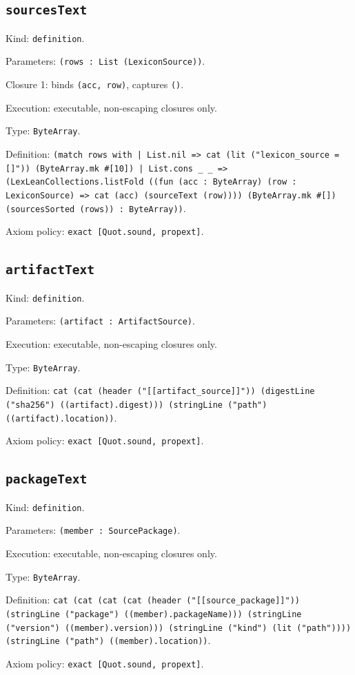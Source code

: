 \documentclass[11pt]{article}
\begin{document}
\subsection*{\texttt{sourcesText}}
\noindent Kind: \texttt{definition}.\par
\noindent Parameters: \texttt{(rows : List (LexiconSource))}.\par
\noindent Closure 1: binds \texttt{(acc, row)}, captures \texttt{()}.\par
\noindent Execution: executable, non-escaping closures only.\par
\noindent Type: \texttt{ByteArray}.\par
\noindent Definition: \texttt{(match rows with | List.nil => cat (lit ("lexicon\_source = []")) (ByteArray.mk \#[10]) | List.cons \_ \_ => (LexLeanCollections.listFold ((fun (acc : ByteArray) (row : LexiconSource) => cat (acc) (sourceText (row)))) (ByteArray.mk \#[]) (sourcesSorted (rows)) : ByteArray))}.\par
\noindent Axiom policy: \texttt{exact [Quot.sound, propext]}.\par
\subsection*{\texttt{artifactText}}
\noindent Kind: \texttt{definition}.\par
\noindent Parameters: \texttt{(artifact : ArtifactSource)}.\par
\noindent Execution: executable, non-escaping closures only.\par
\noindent Type: \texttt{ByteArray}.\par
\noindent Definition: \texttt{cat (cat (header ("[[artifact\_source]]")) (digestLine ("sha256") ((artifact).digest))) (stringLine ("path") ((artifact).location))}.\par
\noindent Axiom policy: \texttt{exact [Quot.sound, propext]}.\par
\subsection*{\texttt{packageText}}
\noindent Kind: \texttt{definition}.\par
\noindent Parameters: \texttt{(member : SourcePackage)}.\par
\noindent Execution: executable, non-escaping closures only.\par
\noindent Type: \texttt{ByteArray}.\par
\noindent Definition: \texttt{cat (cat (cat (cat (header ("[[source\_package]]")) (stringLine ("package") ((member).packageName))) (stringLine ("version") ((member).version))) (stringLine ("kind") (lit ("path")))) (stringLine ("path") ((member).location))}.\par
\noindent Axiom policy: \texttt{exact [Quot.sound, propext]}.\par
\end{document}
